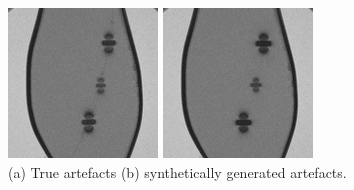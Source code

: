 \documentclass[conference]{IEEEtran}
\begin{document}
\begin{figure}[h]
    \centering
    \begin{minipage}{0.241\textwidth}
        \centering
        \includegraphics[width=\textwidth]{Conference/img/artifact-real.jpg}
    \end{minipage}\hfill \hspace*{0cm}
    \begin{minipage}{0.241\textwidth}
        \centering
        \includegraphics[width=\textwidth]{Conference/img/artifact-generated-superimposed.jpg}
    \end{minipage}\hfill \hspace*{0cm}
    \caption{(a) True artefacts (b) synthetically generated artefacts.}
    \label{fig:real-artefact-vs-simulated-comparison}
\end{figure}
\end{document}
